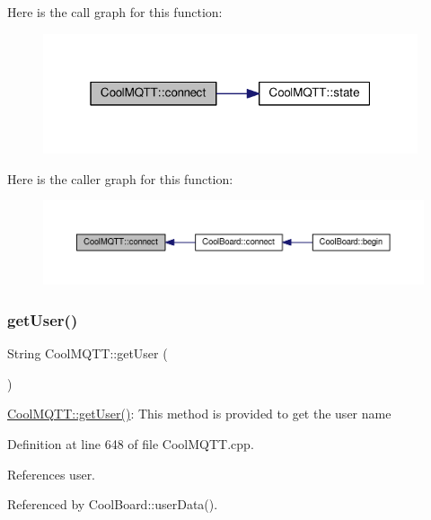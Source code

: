 Here is the call graph for this function\+:
\nopagebreak
\begin{figure}[H]
\begin{center}
\leavevmode
\includegraphics[width=313pt]{classCoolMQTT_a58b0b1f64b269c2681685208262fba1d_cgraph}
\end{center}
\end{figure}
Here is the caller graph for this function\+:
\nopagebreak
\begin{figure}[H]
\begin{center}
\leavevmode
\includegraphics[width=350pt]{classCoolMQTT_a58b0b1f64b269c2681685208262fba1d_icgraph}
\end{center}
\end{figure}
\mbox{\label{classCoolMQTT_a373cc92fca7760d886f02d8a6e5b3f63}} 
\subsubsection{\texorpdfstring{get\+User()}{getUser()}}
{\footnotesize\ttfamily String Cool\+M\+Q\+T\+T\+::get\+User (\begin{DoxyParamCaption}{ }\end{DoxyParamCaption})}

\hyperlink{classCoolMQTT_a373cc92fca7760d886f02d8a6e5b3f63}{Cool\+M\+Q\+T\+T\+::get\+User()}\+: This method is provided to get the user name 

Definition at line 648 of file Cool\+M\+Q\+T\+T.\+cpp.



References user.



Referenced by Cool\+Board\+::user\+Data().


